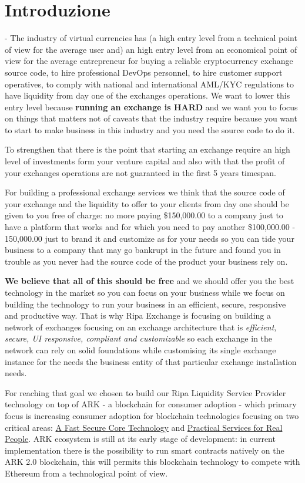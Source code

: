 \documentclass[11pt,fleqn,oneside]{book} %
\begin{document}
\chapter{Introduzione}
- The industry of virtual currencies has (a high entry level from a technical point of view for the average user
and) an high entry level from an economical point of view for the average entrepreneur for buying a reliable cryptocurrency 
exchange source code, to hire professional DevOps personnel, to hire customer support operatives, to comply with national and 
international AML/KYC regulations to have liquidity from day one of the exchanges operations. We want to lower this entry level because
\textbf{running an exchange is HARD} and we want you to focus on things that matters not of caveats that the industry require because
you want to start to make business in this industry and you need the source code to do it.

To strengthen that there is the point that starting an exchange require an high level of investments form your venture capital 
and also with that the profit of your exchanges operations are not guaranteed in the first 5 years timespan.

For building a professional exchange services we think that the source code of your exchange and the liquidity to offer to your clients
from day one should be given to you free of charge: no more paying \$150,000.00 to a company just to have a platform that works and for
which you need to pay another \$100,000.00 - 150,000.00 just to brand it and customize as for your needs so you can tide your 
business to a company that may go bankrupt in the future and found you in trouble as you never had the source code of the product
your business rely on.

\textbf{We believe that all of this should be free} and we should offer you the best technology in the market so you can focus on your business
while we focus on building the technology to run your business in an efficient, secure, responsive and productive way. That is why Ripa Exchange 
is focusing on building a network of exchanges focusing on an exchange architecture that is \textit{efficient, secure, UI responsive, compliant and customizable}
so each exchange in the network can rely on solid foundations while customising its single exchange instance for the needs 
the business entity of that particular exchange installation needs.

For reaching that goal we chosen to build our Ripa Liquidity Service Provider technology on top of ARK - a blockchain for consumer adoption - 
which primary focus is increasing consumer adoption for blockchain technologies focusing on two critical areas: \underline{A Fast Secure Core Technology}
and \underline{Practical Services for Real People}. ARK ecosystem is still at its early stage of development: in current implementation 
there is the possibility to run smart contracts natively on the ARK 2.0 blockchain, this will permits this blockchain technology to compete 
with Ethereum from a technological point of view.
\end{document}
